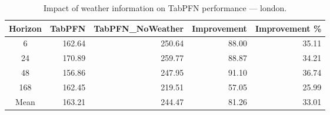 \begin{table}
\centering
\caption{Impact of weather information on TabPFN performance — london.}
\label{tab:tabpfn_weather_london}
\begin{tabular}{crrrr}
\toprule
Horizon & TabPFN & TabPFN\_NoWeather & Improvement & Improvement \% \\
\midrule
6 & 162.64 & 250.64 & 88.00 & 35.11 \\
24 & 170.89 & 259.77 & 88.87 & 34.21 \\
48 & 156.86 & 247.95 & 91.10 & 36.74 \\
168 & 162.45 & 219.51 & 57.05 & 25.99 \\
\midrule
Mean & 163.21 & 244.47 & 81.26 & 33.01 \\
\bottomrule
\end{tabular}
\end{table}
